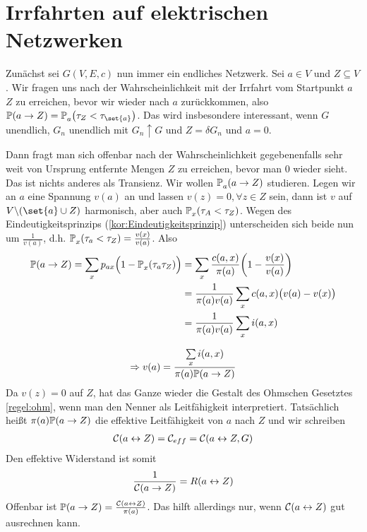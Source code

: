 \section{Irrfahrten auf elektrischen Netzwerken}
Zunächst sei $G(V,E,c)$ nun immer ein endliches Netzwerk. Sei $a \in V$ und $Z \subseteq V$. Wir fragen uns nach der Wahrscheinlichkeit mit der Irrfahrt vom Startpunkt $a$ $Z$ zu erreichen, bevor wir wieder nach $a$ zurückkommen, also $\prop{a \to Z} = \prop{\tau_Z < \tau_{\set{a}}}[][a]$. Das wird insbesondere interessant, wenn $G$ unendlich, $G_n$ unendlich mit $G_n \uparrow G$ und  $Z = \delta G_n$ und $a=0$.

Dann fragt man sich offenbar nach der Wahrscheinlichkeit gegebenenfalls sehr weit von Ursprung entfernte Mengen $Z$ zu erreichen, bevor man $0$ wieder sieht. Das ist nichts anderes als Transienz. Wir wollen $\propE{a \to Z}[][a]$ studieren. Legen wir an $a$ eine Spannung $v(a)$ an und lassen $v(z) = 0, \forall z \in Z$ sein, dann ist $v$ auf $V \backslash(\set{a}\cup Z)$ harmonisch, aber auch $\propE{\tau_A < \tau_Z}[][x]$. Wegen des Eindeutigkeitsprinzips (\ref{kor:Eindeutigkeitsprinzip}) unterscheiden sich beide nun um $\frac{1}{v(a)}$, d.h. $\prop{\tau_a < \tau_Z}[][x] = \frac{v(x)}{v(a)}$. Also
\begin{align}
	\prop{a \to Z} = \sum\limits_{x}p_{ax} \Big(1-\prop{\tau_a \tau_Z}[][x] \Big) &= \sum\limits_{x}\frac{c(a,x)}{\pi(a)}\enb{1-\frac{v(x)}{v(a)}} \\
	&= \frac{1}{\pi(a)v(a)}\sum\limits_{x}c(a,x)\big(v(a)-v(x) \big) \\
	&= \frac{1}{\pi(a)v(a)}\sum\limits_{x}i(a,x)
\end{align}

\begin{align}
	\Rightarrow v(a) = \frac{\sum\limits_{x}i(a,x)}{\pi(a)\prop{a \to Z}}
\end{align}
Da $v(z) = 0$ auf $Z$, hat das Ganze wieder die Gestalt des Ohmschen Gesetztes \ref{regel:ohm}, wenn man den Nenner als Leitfähigkeit interpretiert. Tatsächlich heißt $\pi(a)\prop{a \to Z}$ die effektive Leitfähigkeit von $a$ nach $Z$ und wir schreiben
\begin{align} 
	\leit{a \leftrightarrow Z} = \mathcal{C}_{eff}  = \leit{a\leftrightarrow Z,G}
\end{align}
Den effektive Widerstand ist somit 
\begin{align}
	\frac{1}{\leit{a \to Z}} = R(a \leftrightarrow Z)
\end{align}
Offenbar ist $\prop{a\to Z} = \frac{\leit{a \leftrightarrow Z}}{\pi(a)}$. Das hilft allerdings nur, wenn $\leit{a \leftrightarrow Z}$ gut ausrechnen kann. 

